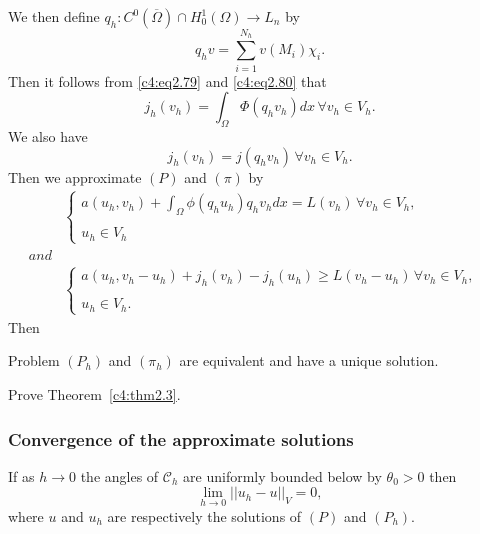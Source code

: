 We then define $q_h : C^0 (\overline{\Omega}) \cap H^1_0 (\Omega) \to L_n$ by 
\begin{equation}
q_h v = \sum^{N_h}_{i=1}v(M_i) \chi_i. \tag{2.80}\label{c4:eq2.80}
\end{equation}
Then it follows from \eqref{c4:eq2.79} and \eqref{c4:eq2.80} that
\begin{equation}
j_h (v_h) = \int_\Omega \Phi (q_h v_h)dx\, \forall v_h \in V_h. \tag{2.81}\label{c4:eq2.81}
\end{equation}
We also have 
\begin{equation}
j_h(v_h) = j(q_h v_h)\, \forall v_h \in V_h. \tag{2.82}\label{c4:eq2.82}
\end{equation}
Then we approximate $(P)$ and $(\pi)$ by 
\begin{align*}
& \begin{cases}
a(u_h, v_h) + \int_\Omega \phi (q_h u_h) q_h v_h dx = L(v_h)\, \forall v_h \in V_h,\\
&\\
u_h \in V_h
\end{cases} \tag{$P_h$}\\
and\\
& \begin{cases}
a(u_h, v_h-u_h) + j_h(v_h) -j_h(u_h) \geq L(v_h-u_h)\, \forall v_h \in V_h,\\
&\\
u_h \in V_h.
\end{cases} \tag{$ \pi_h $}
\end{align*}
Then

\begin{theorem}\label{c4:thm2.3}%
Problem $(P_h)$ and $(\pi_h)$ are equivalent and have a unique solution.
\end{theorem}

\begin{exercise}\label{c4:exer2.4}%
Prove Theorem~\ref{c4:thm2.3}.
\end{exercise}

\subsubsection{Convergence of the approximate solutions}\label{c4:sss2.5.2}

\begin{theorem}\label{c4:thm2.4}%
If as $h \to 0$ the angles of $\mathscr{C}_h$ are uniformly bounded below by $\theta_0 > 0$ then
$$
\lim_{h \to 0} ||u_h - u ||_V = 0,
$$
where $u$ and $u_h$ are respectively the solutions of $(P)$ and $(P_h)$.
\end{theorem}

